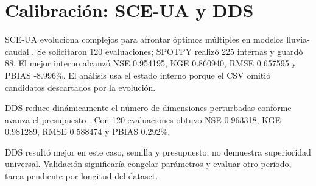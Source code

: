 \chapter{Calibración: SCE-UA y DDS}
SCE-UA evoluciona complejos para afrontar óptimos múltiples en modelos lluvia-caudal \citep{duan1992sceua}. Se solicitaron 120 evaluaciones; SPOTPY realizó 225 internas y guardó 88. El mejor interno alcanzó NSE 0.954195, KGE 0.860940, RMSE 0.657595 y PBIAS -8.996\%. El análisis usa el estado interno porque el CSV omitió candidatos descartados por la evolución.

DDS reduce dinámicamente el número de dimensiones perturbadas conforme avanza el presupuesto \citep{tolson2007dds}. Con 120 evaluaciones obtuvo NSE 0.963318, KGE 0.981289, RMSE 0.588474 y PBIAS 0.292\%.

DDS resultó mejor en este caso, semilla y presupuesto; no demuestra superioridad universal. Validación significaría congelar parámetros y evaluar otro período, tarea pendiente por longitud del dataset.

